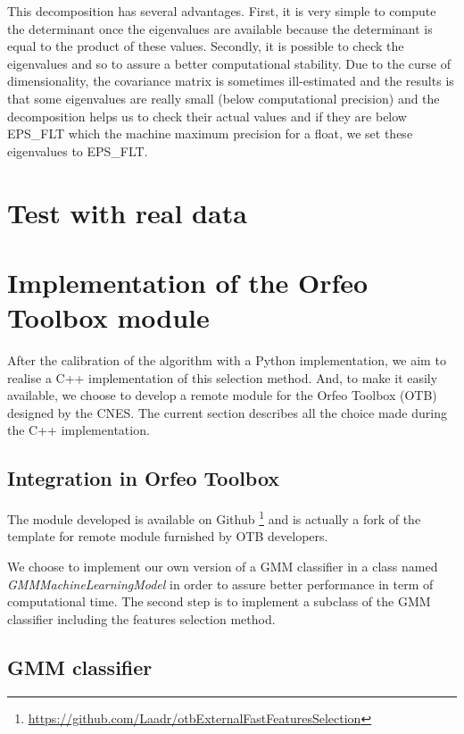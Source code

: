 \documentclass[a4paper]{article}
\begin{document}
        This decomposition has several advantages. First, it is very simple to compute the determinant once the eigenvalues are available because the determinant is equal to the product of these values. Secondly, it is possible to check the eigenvalues and so to assure a better computational stability. Due to the curse of dimensionality, the covariance matrix is sometimes ill-estimated and the results is that some eigenvalues are really small (below computational precision) and the decomposition helps us to check their actual values and if they are below EPS\_FLT which the machine maximum precision for a float, we set these eigenvalues to EPS\_FLT.

    \section{Test with real data}

    \section{Implementation of the Orfeo Toolbox module}

    After the calibration of the algorithm with a Python implementation, we aim to realise a C++ implementation of this selection method. And, to make it easily available, we choose to develop a remote module for the Orfeo Toolbox (OTB) designed by the CNES. The current section describes all the choice made during the C++ implementation.

        \subsection{Integration in Orfeo Toolbox}

        The module developed is available on Github \footnote{\url{https://github.com/Laadr/otbExternalFastFeaturesSelection}} and is actually a fork of the template for remote module furnished by OTB developers.

        We choose to implement our own version of a GMM classifier in a class named \emph{GMMMachineLearningModel} in order to assure better performance in term of computational time. The second step is to implement a subclass of the GMM classifier including the features selection method.

        \subsection{GMM classifier}
\end{document}
